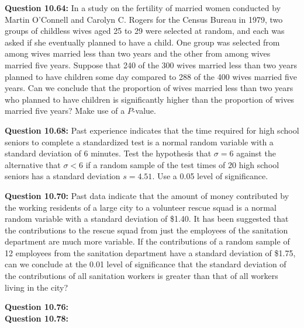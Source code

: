 \documentclass{article}
\begin{document}
\textbf{Question 10.64:}
In a study on the fertility of married women
conducted by Martin O’Connell and Carolyn C. Rogers
for the Census Bureau in 1979, two groups of childless
wives aged 25 to 29 were selected at random, and each
was asked if she eventually planned to have a child.
One group was selected from among wives married
less than two years and the other from among wives
married five years. Suppose that 240 of the 300 wives
married less than two years planned to have children
some day compared to 288 of the 400 wives married
five years. Can we conclude that the proportion of
wives married less than two years who planned to have
children is significantly higher than the proportion of
wives married five years? Make use of a $P$-value.
\newline

\textbf{Question 10.68:}
Past experience indicates that the time required 
for high school seniors to complete a standardized 
test is a normal random variable with a standard
deviation of 6 minutes. Test the hypothesis that $\sigma = 6$
against the alternative that $\sigma < 6$ if a random sample of
the test times of 20 high school seniors has a standard
deviation $s = 4.51$. Use a 0.05 level of significance.
\newline

\textbf{Question 10.70:}
Past data indicate that the amount of money
contributed by the working residents of a large city to
a volunteer rescue squad is a normal random variable
with a standard deviation of \$1.40. It has been 
suggested that the contributions to the rescue squad from
just the employees of the sanitation department are
much more variable. If the contributions of a random
sample of 12 employees from the sanitation department
have a standard deviation of \$1.75, can we conclude at
the 0.01 level of significance that the standard 
deviation of the contributions of all sanitation workers is
greater than that of all workers living in the city?
\newline

\textbf{Question 10.76:}
\\

\textbf{Question 10.78:}
\end{document}

